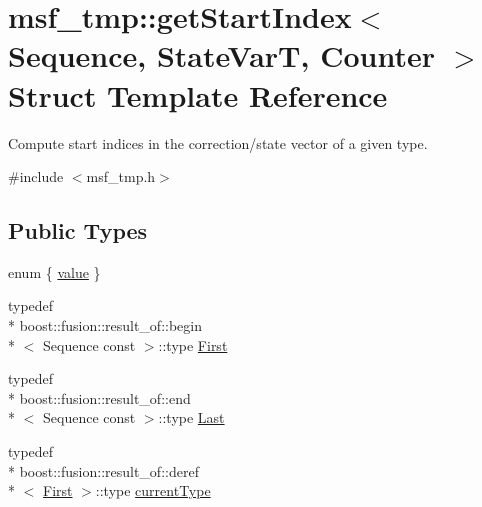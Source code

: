 \hypertarget{structmsf__tmp_1_1getStartIndex}{\section{msf\-\_\-tmp\-:\-:get\-Start\-Index$<$ Sequence, State\-Var\-T, Counter $>$ Struct Template Reference}
\label{structmsf__tmp_1_1getStartIndex}
}


Compute start indices in the correction/state vector of a given type.  




{\ttfamily \#include $<$msf\-\_\-tmp.\-h$>$}

\subsection*{Public Types}
\begin{DoxyCompactItemize}
\item 
enum \{ \hyperlink{structmsf__tmp_1_1getStartIndex_ac40f372ad7bfcafacffb12b276ecc849a9b343ca7b3947537646aa5ebb03142b4}{value}
 \}
\item 
typedef \\*
boost\-::fusion\-::result\-\_\-of\-::begin\\*
$<$ Sequence const  $>$\-::type \hyperlink{structmsf__tmp_1_1getStartIndex_a1cc5754b8602cfbd8e61f73cff974a6b}{First}
\item 
typedef \\*
boost\-::fusion\-::result\-\_\-of\-::end\\*
$<$ Sequence const  $>$\-::type \hyperlink{structmsf__tmp_1_1getStartIndex_ab21b8aa838fc319c251de994cb353f97}{Last}
\item 
typedef \\*
boost\-::fusion\-::result\-\_\-of\-::deref\\*
$<$ \hyperlink{structmsf__tmp_1_1getStartIndex_a1cc5754b8602cfbd8e61f73cff974a6b}{First} $>$\-::type \hyperlink{structmsf__tmp_1_1getStartIndex_a53bb8aad63f0647cd38ebd138fb065ea}{current\-Type}
\end{DoxyCompactItemize}



